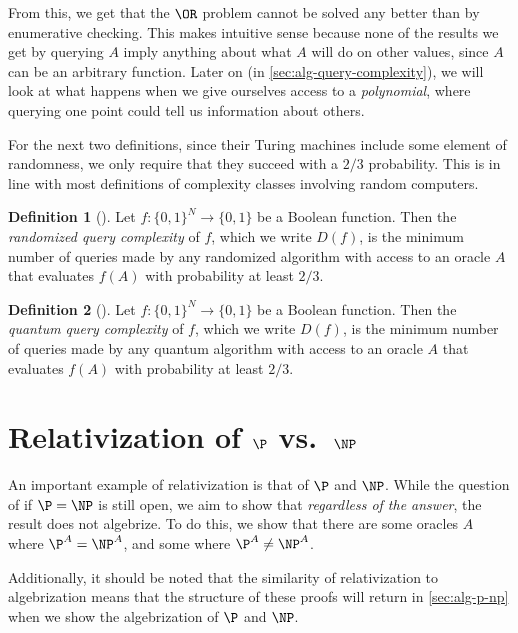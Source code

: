 \documentclass[english,12pt]{reedthesis}
\theoremstyle{plain}
\theoremstyle{definition}
\newtheorem{defn}[defn]{Definition}
\theoremstyle{remark}
\begin{document}
From this, we get that the $\OR$ problem cannot be solved any better than by
enumerative checking. This makes intuitive sense because none of the results we
get by querying $A$ imply anything about what $A$ will do on other values, since
$A$ can be an arbitrary function. Later on (in \cref{sec:alg-query-complexity}),
we will look at what happens when we give ourselves access to a
\emph{polynomial}, where querying one point could tell us information about
others.

For the next two definitions, since their Turing machines include some element
of randomness, we only require that they succeed with a $2/3$ probability. This
is in line with most definitions of complexity classes involving random
computers.

\begin{defn}[{\cite[17]{AW09}}]\label{def:rand-qc}
  Let $f\colon \{0, 1\}^{N} \rightarrow \{0, 1\}$ be a Boolean function. Then the
  \emph{randomized query complexity} of $f$, which we write $D(f)$, is the
  minimum number of queries made by any randomized algorithm with access to an
  oracle $A$ that evaluates $f(A)$ with probability at least $2/3$.
\end{defn}


\begin{defn}[{\cite[17]{AW09}}]\label{def:quant-qc}
  Let $f\colon \{0, 1\}^{N} \rightarrow \{0, 1\}$ be a Boolean function. Then the
  \emph{quantum query complexity} of $f$, which we write $D(f)$, is the minimum
  number of queries made by any quantum algorithm with access to an oracle $A$
  that evaluates $f(A)$ with probability at least $2/3$.
\end{defn}

\section{Relativization of $\P$ vs.\ $\NP$}\label{sec:rel-p-np}

An important example of relativization is that of $\P$ and $\NP$. While the
question of if $\P = \NP$ is still open, we aim to show that \emph{regardless of
the answer}, the result does not algebrize. To do this, we show that there are
some oracles $A$ where $\P^{A} = \NP^{A}$, and some where $\P^{A} \ne \NP^{A}$.

Additionally, it should be noted that the similarity of relativization to
algebrization means that the structure of these proofs will return in
\cref{sec:alg-p-np} when we show the algebrization of $\P$ and $\NP$.
\end{document}
